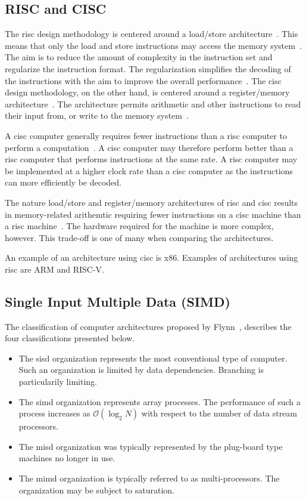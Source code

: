 \subsection{RISC and CISC}

The \acrfull{risc} design methodology is centered around a load/store architecture~\cite{flynn1998}. This means that only the load and store instructions may access the memory system~\cite{carter2002}. The aim is to reduce the amount of complexity in the instruction set and regularize the instruction format. The regularization simplifies the decoding of the instructions with the aim to improve the overall performance~\cite{flynn1998}. The \acrfull{cisc} design methodology, on the other hand, is centered around a register/memory architecture~\cite{flynn1998}. The architecture permits arithmetic and other instructions to read their input from, or write to the memory system~\cite{carter2002}.

A \gls{cisc} computer generally requires fewer instructions than a \gls{risc} computer to perform a computation~\cite{carter2002}. A \gls{cisc} computer may therefore perform better than a \gls{risc} computer that performs instructions at the same rate. A \gls{risc} computer may be implemented at a higher clock rate than a \gls{cisc} computer as the instructions can more efficiently be decoded.

The nature load/store and register/memory architectures of \gls{risc} and \gls{cisc} results in memory-related arithemtic requiring fewer instructions on a \gls{cisc} machine than a \gls{risc} machine~\cite{carter2002}. The hardware required for the machine is more complex, however. This trade-off is one of many when comparing the architectures.

An example of an architecture using \gls{cisc} is \gls{x86}. Examples of architectures using \gls{risc} are ARM and RISC-V.

\subsection{Single Input Multiple Data (SIMD)}
\label{section:background:simd-avx}

The classification of computer architectures proposed by Flynn~\cite{flynn1972}, describes the four classifications presented below.

\begin{itemize}
    \item The \gls{sisd} organization represents the most conventional type of computer. Such an organization is limited by data dependencies. Branching is particularily limiting.
    \item The \gls{simd} organization represents array processes. The performance of such a process increases as $\mathcal{O}(\log_2 N)$ with respect to the number of data stream processors. 
    \item The \gls{misd} organization was typically represented by the plug-board type machines no longer in use.
    \item The \gls{mimd} organization is typically referred to as multi-processors. The organization may be subject to saturation.
\end{itemize}

